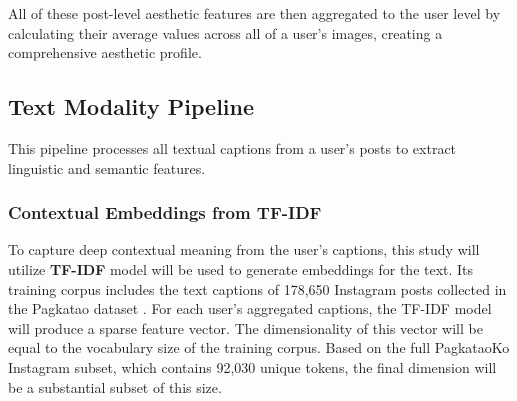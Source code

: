 All of these post-level aesthetic features are then aggregated to the user level by calculating their average values across all of a user's images, creating a comprehensive aesthetic profile.


\subsection{Text Modality Pipeline}
This pipeline processes all textual captions from a user's posts to extract linguistic and semantic features.

\subsubsection{Contextual Embeddings from TF-IDF}
To capture deep contextual meaning from the user's captions, this study will utilize \textbf{TF-IDF} model will be used to generate embeddings for the text. Its training corpus includes the text captions of 178,650 Instagram posts collected in the Pagkatao dataset \citep{tighe_acorda_2022}. For each user's aggregated captions, the TF-IDF model will produce a sparse feature vector. The dimensionality of this vector will be equal to the vocabulary size of the training corpus. Based on the full PagkataoKo Instagram subset, which contains 92,030 unique tokens, the final dimension will be a substantial subset of this size.

